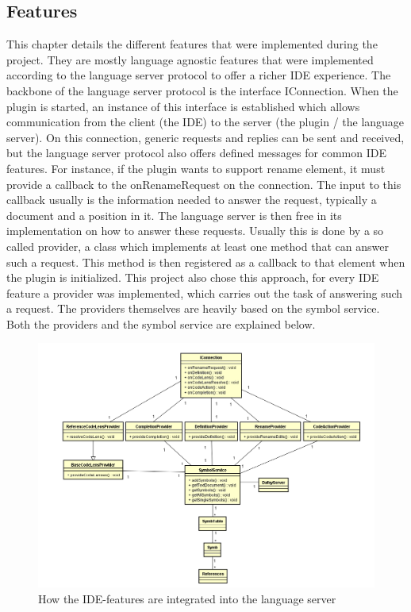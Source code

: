 \subsection{Features} \label{features}
This chapter details the different features that were implemented during the project. They are mostly language agnostic features that were implemented according to the language server protocol to offer a richer IDE experience. The backbone of the language server protocol is the interface IConnection. When the plugin is started, an instance of this interface is established which allows communication from the client (the IDE) to the server (the plugin / the language server). On this connection, generic requests and replies can be sent and received, but the language server protocol also offers defined messages for common IDE features. \newline
For instance, if the plugin wants to support rename element, it must provide a callback to the onRenameRequest on the connection. The input to this callback usually is the information needed to answer the request, typically a document and a position in it. The language server is then free in its implementation on how to answer these requests. \newline
Usually this is done by a so called provider, a class which implements at least one method that can answer such a request. This method is then registered as a callback to that element when the plugin is initialized.\newline
This project also chose this approach, for every IDE feature a provider was implemented, which carries out the task of answering such a request. The providers themselves are heavily based on the symbol service. Both the providers and the symbol service are explained below. 


\begin{figure}[H]
	\centering
	\includegraphics[width=1\textwidth]{img/featureArchitecture}
	\caption{How the IDE-features are integrated into the language server}
	\label{fig:featurearchitecture}
\end{figure}


